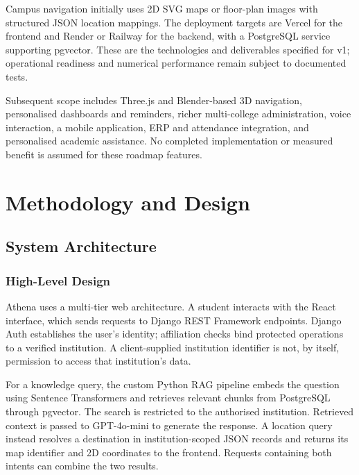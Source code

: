 \documentclass{tietreport}
\begin{document}
Campus navigation initially uses 2D SVG maps or floor-plan images with structured
JSON location mappings. The deployment targets are Vercel for the frontend and
Render or Railway for the backend, with a PostgreSQL service supporting pgvector.
These are the technologies and deliverables specified for v1; operational
readiness and numerical performance remain subject to documented tests.

Subsequent scope includes Three.js and Blender-based 3D navigation,
personalised dashboards and reminders, richer multi-college administration,
voice interaction, a mobile application, ERP and attendance integration, and
personalised academic assistance. No completed implementation or measured
benefit is assumed for these roadmap features.

\chapter{Methodology and Design}

\section{System Architecture}

\subsection{High-Level Design}

Athena uses a multi-tier web architecture. A student interacts with the React
interface, which sends requests to Django REST Framework endpoints. Django Auth
establishes the user's identity; affiliation checks bind protected operations
to a verified institution. A client-supplied institution identifier is not,
by itself, permission to access that institution's data.

For a knowledge query, the custom Python RAG pipeline embeds the question using
Sentence Transformers and retrieves relevant chunks from PostgreSQL through
pgvector. The search is restricted to the authorised institution. Retrieved
context is passed to GPT-4o-mini to generate the response. A location query
instead resolves a destination in institution-scoped JSON records and returns
its map identifier and 2D coordinates to the frontend. Requests containing both
intents can combine the two results.
\end{document}

